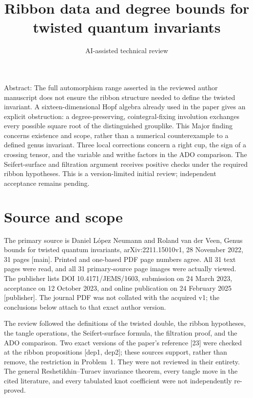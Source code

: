 \documentclass[10pt]{article}
\title{Ribbon data and degree bounds
for twisted quantum invariants}
\author{AI-assisted technical review}
\date{}
\begin{document}
\maketitle
Abstract: The full automorphism range asserted in the reviewed author manuscript does not ensure the ribbon structure needed to define the twisted invariant. A sixteen-dimensional Hopf algebra already used in the paper gives an explicit obstruction: a degree-preserving, cointegral-fixing involution exchanges every possible square root of the distinguished grouplike. This Major finding concerns existence and scope, rather than a numerical counterexample to a defined genus invariant. Three local corrections concern a right cup, the sign of a crossing tensor, and the variable and writhe factors in the ADO comparison. The Seifert-surface and filtration argument receives positive checks under the required ribbon hypotheses. This is a version-limited initial review; independent acceptance remains pending.\par
\section*{Source and scope}
The primary source is Daniel López Neumann and Roland van der Veen, Genus bounds for twisted quantum invariants, arXiv:2211.15010v1, 28 November 2022, 31 pages [main]. Printed and one-based PDF page numbers agree. All 31 text pages were read, and all 31 primary-source page images were actually viewed. The publisher lists DOI 10.4171/JEMS/1603, submission on 24 March 2023, acceptance on 12 October 2023, and online publication on 24 February 2025 [publisher]. The journal PDF was not collated with the acquired v1; the conclusions below attach to that exact author version.\par
The review followed the definitions of the twisted double, the ribbon hypotheses, the tangle operations, the Seifert-surface formula, the filtration proof, and the ADO comparison. Two exact versions of the paper’s reference [23] were checked at the ribbon propositions [dep1, dep2]; these sources support, rather than remove, the restriction in Problem 1. They were not reviewed in their entirety. The general Reshetikhin–Turaev invariance theorem, every tangle move in the cited literature, and every tabulated knot coefficient were not independently re-proved.\par
\end{document}
